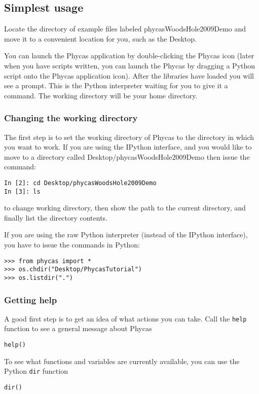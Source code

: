 \documentclass{article}
\newcommand{\cmd}[1]{\texttt{#1}\xspace}
\newcommand{\phycas}{Phycas\xspace}
\newcommand{\localfile}[1]{\textsf{#1}\xspace}
\begin{document}
\subsection{Simplest usage}
Locate the directory of example files labeled \localfile{phycasWoodsHole2009Demo} and move it to a convenient location for you, such as the Desktop.


You can launch the \phycas application by double-clicking the \phycas icon  (later when you have scripts written, you can launch the \phycas by dragging a Python script onto the \phycas application icon).
After the libraries have loaded you will see a prompt.
This is the Python interpreter waiting for you to give it a command.
The working directory will be your home directory.

\subsubsection{Changing the working directory}
The first step is to set the working directory of \phycas to the directory in which you want to work.
If you are using the IPython interface, and you would like to  move to a directory called \localfile{Desktop/phycasWoodsHole2009Demo} then issue the command:
\begin{verbatim}
In [2]: cd Desktop/phycasWoodsHole2009Demo
In [3]: ls
\end{verbatim}
to change working directory, then show the path to the current directory, and finally list the directory contents.

If you are using the raw Python interpreter (instead of the IPython interface), you have to issue the commands in Python:
\begin{verbatim}
>>> from phycas import *
>>> os.chdir("Desktop/PhycasTutorial")
>>> os.listdir(".")
\end{verbatim}

\subsubsection{Getting help}
A good first step is to get an idea of what actions you can take. 
Call the \cmd{help} function to see a general message about \phycas
\begin{verbatim}
help()
\end{verbatim}

To see what functions and variables are currently available, you can 
use the Python \cmd{dir} function
\begin{verbatim}
dir()
\end{verbatim}
\end{document}
